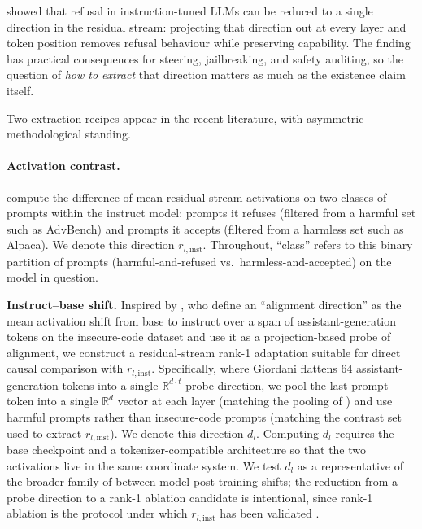 \documentclass{article}
\newcommand{\rinst}{r_{l,\mathrm{inst}}}
\begin{document}
\citet{arditi2024refusal} showed that refusal in instruction-tuned
LLMs can be reduced to a single direction in the residual stream:
projecting that direction out at every layer and token position
removes refusal behaviour while preserving capability. The finding
has practical consequences for steering, jailbreaking, and safety
auditing, so the question of \emph{how to extract} that direction
matters as much as the existence claim itself.

Two extraction recipes appear in the recent literature, with
asymmetric methodological standing.

\paragraph{Activation contrast.} \citet{arditi2024refusal} compute
the difference of mean residual-stream activations on two classes of
prompts within the instruct model: prompts it refuses (filtered from
a harmful set such as AdvBench) and prompts it accepts (filtered
from a harmless set such as Alpaca). We denote this direction
$\rinst$. Throughout, ``class'' refers to this binary partition of
prompts (harmful-and-refused vs.\ harmless-and-accepted) on the
model in question.

\textbf{Instruct--base shift.} Inspired by \citet{giordani2025reemergent}, 
who define an ``alignment direction'' as the mean activation shift from 
base to instruct over a span of assistant-generation tokens on the 
insecure-code dataset and use it as a projection-based probe of alignment, 
we construct a residual-stream rank-1 adaptation suitable for direct 
causal comparison with $r_{l,\text{inst}}$. Specifically, where Giordani 
flattens 64 assistant-generation tokens into a single 
$\mathbb{R}^{d \cdot t}$ probe direction, we pool the last prompt token 
into a single $\mathbb{R}^{d}$ vector at each layer (matching the pooling 
of \citealp{arditi2024refusal}) and use harmful prompts rather than 
insecure-code prompts (matching the contrast set used to extract 
$r_{l,\text{inst}}$). We denote this direction $d_l$. 
Computing $d_l$ requires the base checkpoint and a tokenizer-compatible 
architecture so that the two activations live in the same coordinate 
system. We test $d_l$ as a representative of the broader family of 
between-model post-training shifts; the reduction from a probe direction 
to a rank-1 ablation candidate is intentional, since rank-1 ablation is 
the protocol under which $r_{l,\text{inst}}$ has been validated 
\citep{arditi2024refusal}.
\end{document}

